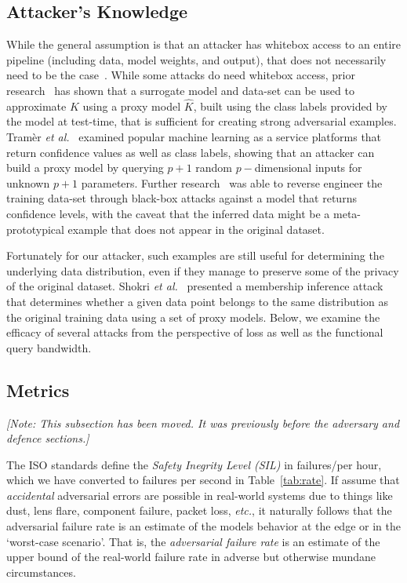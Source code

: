 \documentclass[journal]{IEEEtran}
\newcommand{\cm}[1]{\textit{{\color{blue}#1}}}
\begin{document}
\subsection{Attacker's Knowledge}
 While the general assumption is that an attacker has whitebox access to an entire pipeline (including data, model weights, and output), that does not necessarily need to be the case~\cite{hopskipjump, chakraborty_adversarial_2018}. While some attacks do need whitebox access, prior research~\cite{hopskipjump, nelson2010behavior} has shown that a surrogate model and data-set can be used to approximate $K$ using a proxy model $\widehat{K}$, built using the class labels provided by the model at test-time, that is sufficient for creating strong adversarial examples. Tram\`er \textit{et al.}~\cite{tramer2016stealing} examined popular machine learning as a service platforms that return confidence values as well as class labels, showing that an attacker can build a proxy model by querying $ p + 1$ random $p-$dimensional inputs for unknown $p+1$ parameters. Further research~\cite{fredrikson_model_2015} was able to reverse engineer the training data-set through black-box attacks against a model that returns confidence levels, with the caveat that the inferred data might be a meta-prototypical example that does not appear in the original dataset. 

Fortunately for our attacker, such examples are still useful for determining the underlying data distribution, even if they manage to preserve some of the privacy of the original dataset. Shokri \textit{et al.}~\cite{shokri2017membership} presented a membership inference attack that determines whether a given data point belongs to the same distribution as the original training data using a set of proxy models.  Below, we examine the efficacy of several attacks from the perspective of loss as well as the functional query bandwidth.



\subsection{Metrics}

\cm{[Note: This subsection has been moved. It was previously before the adversary and defence sections.]}

\label{metrics}
The ISO standards \cite{iso26262} define the \cm{Safety Inegrity Level (SIL)} in failures/per hour, which we have converted to failures per second in Table~\ref{tab:rate}. If assume that \textit{accidental} adversarial errors are possible in real-world systems due to things like dust, lens flare, component failure, packet loss, \textit{etc.}, it naturally follows that the adversarial failure rate is an estimate of the models behavior at the edge or in the `worst-case scenario'. That is, the \textit{adversarial failure rate} is an estimate of the upper bound of the real-world failure rate in adverse but otherwise mundane circumstances. 
\end{document}
